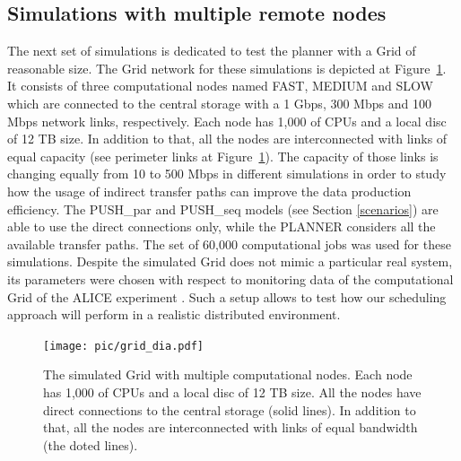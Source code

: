 \documentclass{svjour3}                     %
\begin{document}
\subsection{Simulations with multiple remote nodes}
\label{3nodesSim}
The next set of simulations is dedicated to test the planner with a Grid of reasonable size. The Grid network for these simulations is depicted at Figure~\ref{simulated_grid}. It consists of three computational nodes named FAST, MEDIUM and SLOW which are connected to the central storage with a 1 Gbps, 300 Mbps and 100 Mbps network links, respectively. Each node has 1,000 of CPUs and a local disc of 12 TB size. In addition to that, all the nodes are interconnected with links of equal capacity (see perimeter links at Figure~\ref{simulated_grid}). The capacity of those links is changing equally from 10 to 500 Mbps in different simulations in order to study how the usage of indirect transfer paths can improve the data production efficiency. The PUSH\_par and PUSH\_seq models (see Section \ref{scenarios}) are able to use the direct connections only, while the PLANNER considers all the available transfer paths. The set of 60,000 computational jobs was used for these simulations.
Despite the simulated Grid does not mimic a particular real system, its parameters were chosen with respect to monitoring data of the computational Grid of the ALICE experiment \cite{MonAlisa}. Such a setup allows to test how our scheduling approach will perform in a realistic distributed environment. 
\begin{figure}[b]
  \begin{center}
    \texttt{[image: pic/grid\_dia.pdf]}
    \caption{The simulated Grid with multiple computational nodes. Each node has 1,000 of CPUs and a local disc of 12 TB size. All the nodes have direct connections to the central storage (solid lines). In addition to that, all the nodes are interconnected with links of equal bandwidth (the doted lines).}
    \label{simulated_grid}	
  \end{center}  
\end{figure}
\end{document}
